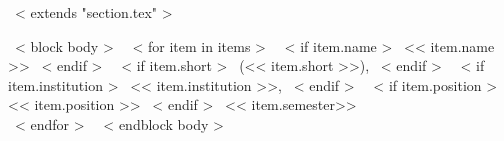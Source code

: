 ~< extends "section.tex" >~

~< block body >~
    ~< for item in items >~
        ~< if item.name >~
        << item.name >>
        ~< endif >~
        ~< if item.short >~
        (<< item.short >>),
        ~< endif >~
        ~< if item.institution >~
        << item.institution >>,
        ~< endif >~
        ~< if item.position >~
        << item.position >>
        ~< endif >~
        \hfill
        << item.semester>> \\
    ~< endfor >~
~< endblock body >~
